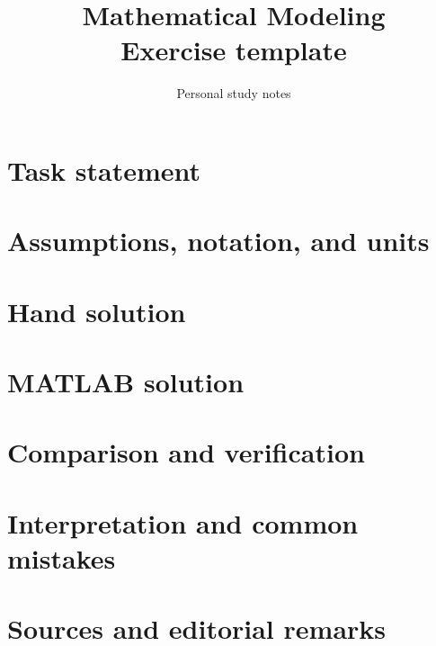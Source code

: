 \documentclass[11pt,a4paper]{article}
\title{\textbf{Mathematical Modeling}\\[2mm]\large Exercise template}
\author{Personal study notes}
\date{}
\begin{document}
\maketitle
\section{Task statement}\label{sec:task}
\section{Assumptions, notation, and units}\label{sec:assumptions}
\section{Hand solution}\label{sec:hand}
\section{MATLAB solution}\label{sec:matlab}
\section{Comparison and verification}\label{sec:verification}
\section{Interpretation and common mistakes}\label{sec:interpretation}
\section{Sources and editorial remarks}\label{sec:sources}
\end{document}

